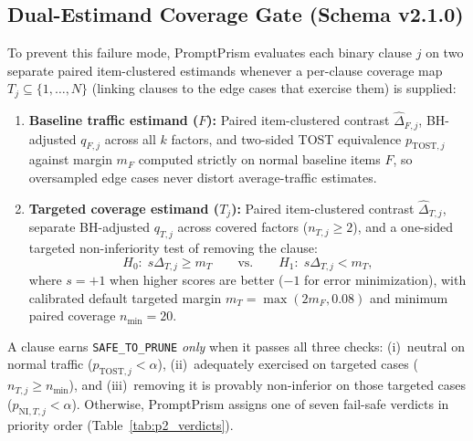 \documentclass[11pt,a4paper]{article}
\newcommand{\method}{PromptPrism}
\begin{document}
\subsection{Dual-Estimand Coverage Gate (Schema v2.1.0)}
To prevent this failure mode, \method{} evaluates each binary clause $j$ on two separate paired item-clustered estimands whenever a per-clause coverage map $T_j \subseteq \{1,\dots,N\}$ (linking clauses to the edge cases that exercise them) is supplied:
\begin{enumerate}[leftmargin=*,nosep]
    \item \textbf{Baseline traffic estimand ($F$):} Paired item-clustered contrast $\hat{\Delta}_{F,j}$, BH-adjusted $q_{F,j}$ across all $k$ factors, and two-sided TOST equivalence $p_{\mathrm{TOST},j}$ against margin $m_F$ computed strictly on normal baseline items $F$, so oversampled edge cases never distort average-traffic estimates.
    \item \textbf{Targeted coverage estimand ($T_j$):} Paired item-clustered contrast $\hat{\Delta}_{T,j}$, separate BH-adjusted $q_{T,j}$ across covered factors ($n_{T,j} \ge 2$), and a one-sided targeted non-inferiority test of removing the clause:
    \[
        H_0:\; s\Delta_{T,j} \ge m_T \qquad \text{vs.} \qquad H_1:\; s\Delta_{T,j} < m_T,
    \]
    where $s = +1$ when higher scores are better ($-1$ for error minimization), with calibrated default targeted margin $m_T = \max(2m_F, 0.08)$ and minimum paired coverage $n_{\min} = 20$.
\end{enumerate}

A clause earns \texttt{SAFE\_TO\_PRUNE} \emph{only} when it passes all three checks: (i)~neutral on normal traffic ($p_{\mathrm{TOST},j} < \alpha$), (ii)~adequately exercised on targeted cases ($n_{T,j} \ge n_{\min}$), and (iii)~removing it is provably non-inferior on those targeted cases ($p_{\mathrm{NI},T,j} < \alpha$). Otherwise, \method{} assigns one of seven fail-safe verdicts in priority order (Table~\ref{tab:p2_verdicts}).
\end{document}
